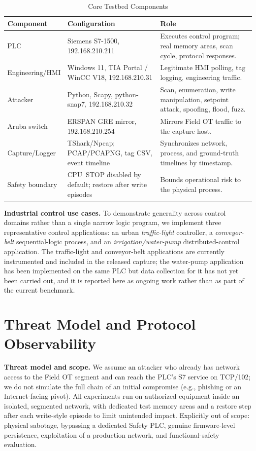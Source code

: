 \documentclass[conference]{IEEEtran}
\begin{document}
\begin{table}[t]
\centering
\caption{Core Testbed Components}
\label{tab:testbed_components}
\begin{tabular}{p{1.7cm}p{2.4cm}p{3.6cm}}
\toprule
\textbf{Component} & \textbf{Configuration} & \textbf{Role} \\
\midrule
PLC & Siemens S7-1500, 192.168.210.211 & Executes control program; real memory areas, scan cycle, protocol responses. \\
Engineering/HMI & Windows 11, TIA Portal / WinCC V18, 192.168.210.31 & Legitimate HMI polling, tag logging, engineering traffic. \\
Attacker & Python, Scapy, python-snap7, 192.168.210.32 & Scan, enumeration, write manipulation, setpoint attack, spoofing, flood, fuzz. \\
Aruba switch & ERSPAN GRE mirror, 192.168.210.254 & Mirrors Field OT traffic to the capture host. \\
Capture/Logger & TShark/Npcap; PCAP/PCAPNG, tag CSV, event timeline & Synchronizes network, process, and ground-truth timelines by timestamp. \\
Safety boundary & CPU~STOP disabled by default; restore after write episodes & Bounds operational risk to the physical process. \\
\bottomrule
\end{tabular}
\end{table}

\textbf{Industrial control use cases.} To demonstrate generality across control domains rather than a single narrow logic program, we implement three representative control applications: an urban \emph{traffic-light} controller, a \emph{conveyor-belt} sequential-logic process, and an \emph{irrigation/water-pump} distributed-control application. The traffic-light and conveyor-belt applications are currently instrumented and included in the released capture; the water-pump application has been implemented on the same PLC but data collection for it has not yet been carried out, and it is reported here as ongoing work rather than as part of the current benchmark.

\section{Threat Model and Protocol Observability}

\textbf{Threat model and scope.} We assume an attacker who already has network access to the Field OT segment and can reach the PLC's S7 service on TCP/102; we do not simulate the full chain of an initial compromise (e.g., phishing or an Internet-facing pivot). All experiments run on authorized equipment inside an isolated, segmented network, with dedicated test memory areas and a restore step after each write-style episode to limit unintended impact. Explicitly out of scope: physical sabotage, bypassing a dedicated Safety PLC, genuine firmware-level persistence, exploitation of a production network, and functional-safety evaluation.
\end{document}
